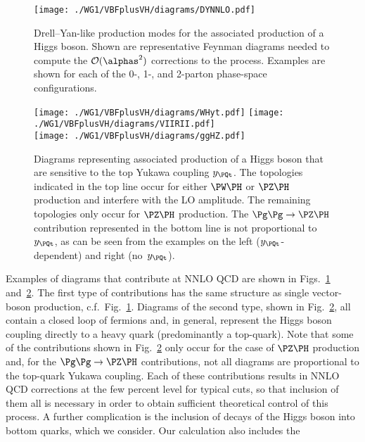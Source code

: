 \begin{figure}
\begin{center}
\texttt{[image: ./WG1/VBFplusVH/diagrams/DYNNLO.pdf]}
\caption{Drell--Yan-like production modes for the associated production of a Higgs boson. Shown are representative Feynman diagrams needed
to compute the $\mathcal{O}(\alphas^2)$ corrections to the process. Examples are shown for each of the 0-, 1-, and 2-parton phase-space configurations.}
\label{fig:DYNNLO}
\end{center}
\end{figure}
%
\begin{figure}
\begin{center}
\texttt{[image: ./WG1/VBFplusVH/diagrams/WHyt.pdf]}
\texttt{[image: ./WG1/VBFplusVH/diagrams/VIIRII.pdf]} \\ \vspace*{4mm}
\texttt{[image: ./WG1/VBFplusVH/diagrams/ggHZ.pdf]}
\caption{Diagrams representing associated production of a Higgs boson that
are sensitive to the top Yukawa coupling $y_{\PQt}$.
The topologies indicated in the top line occur for either $\PW\PH$ or $\PZ\PH$ production
and interfere with the LO amplitude. The remaining topologies
only occur for $\PZ\PH$ production.  The $\Pg\Pg\rightarrow \PZ\PH$ contribution represented
in the bottom line is not proportional to $y_{\PQt}$, as can be seen from
the examples on the left ($y_{\PQt}$-dependent) and right (no~$y_{\PQt}$).
}
\label{fig:Yt}
\end{center}
\end{figure}
%
Examples of diagrams that contribute at NNLO QCD are
shown in Figs.~\ref{fig:DYNNLO} and~\ref{fig:Yt}.
The first type of contributions has the same structure
as single vector-boson production, c.f.\ Fig.~\ref{fig:DYNNLO}.
Diagrams of the second type, shown in Fig.~\ref{fig:Yt}, all contain
a closed loop of fermions and, in general, represent
the Higgs boson coupling directly to a heavy quark (predominantly a top-quark).
Note that some of the contributions shown in Fig.~\ref{fig:Yt} only
occur for the case of $\PZ\PH$ production and, for the $\Pg\Pg \to \PZ\PH$ contributions,
not all diagrams are proportional to the top-quark Yukawa coupling.
Each of these contributions results in NNLO QCD corrections at the few percent level
for typical cuts, so that inclusion of them all is necessary in order
to obtain sufficient theoretical control of this process.
A further complication is the inclusion of decays of the Higgs boson into
bottom quarks, which we consider.  Our calculation also includes the
